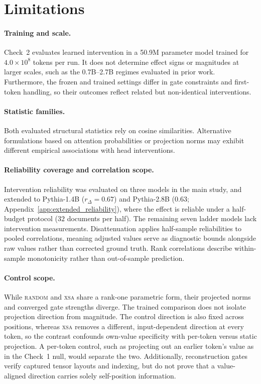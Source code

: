\documentclass{article} %
\begin{document}
\section{Limitations}

\paragraph{Training and scale.} Check~2 evaluates learned intervention in a
50.9M parameter model trained for $4.0\times10^{8}$ tokens per run. It does
not determine effect signs or magnitudes at larger scales, such as the
0.7B--2.7B regimes evaluated in prior work. Furthermore, the frozen and trained
settings differ in gate constraints and first-token handling, so their outcomes
reflect related but non-identical interventions.

\paragraph{Statistic families.} Both evaluated structural statistics rely on
cosine similarities. Alternative formulations based on attention probabilities
or projection norms may exhibit different empirical associations with head
interventions.

\paragraph{Reliability coverage and correlation scope.} Intervention reliability
was evaluated on three models in the main study, and extended to Pythia-1.4B ($r_\Delta = 0.67$)
and Pythia-2.8B ($0.63$; Appendix~\ref{app:extended_reliability}), where the effect is reliable
under a half-budget protocol ($32$ documents per half). The remaining seven ladder models lack intervention measurements.
Disattenuation applies half-sample reliabilities to pooled correlations, meaning adjusted values
serve as diagnostic bounds alongside raw values rather than corrected ground truth. Rank correlations
describe within-sample monotonicity rather than out-of-sample prediction.

\paragraph{Control scope.} While \textsc{random} and \textsc{xsa} share a
rank-one parametric form, their projected norms and converged gate strengths
diverge. The trained comparison does not isolate projection direction from
magnitude. The control direction is also fixed across positions, whereas
\textsc{xsa} removes a different, input-dependent direction at every token,
so the contrast confounds own-value specificity with per-token versus static
projection. A per-token control, such as projecting out an earlier token's
value as in the Check~1 null, would separate the two. Additionally, reconstruction gates verify captured tensor layouts
and indexing, but do not prove that a value-aligned direction carries solely
self-position information.
\end{document}
